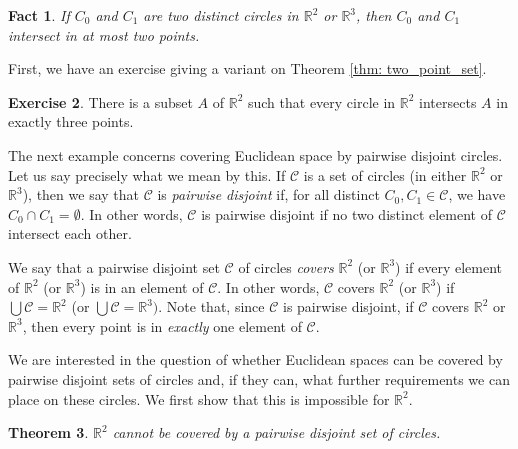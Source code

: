 \documentclass[a4paper]{memoir}
\newtheorem{theorem}{Theorem}[section]
\newtheorem{fact}[theorem]{Fact}
\theoremstyle{definition}
\newtheorem{exercise}[theorem]{Exercise}
\newcommand{\bb}{\mathbb}
\newcommand{\mc}{\mathcal}
\begin{document}
\begin{fact}
  If $C_0$ and $C_1$ are two distinct circles in $\bb{R}^2$ or $\bb{R}^3$, then $C_0$ and $C_1$ 
  intersect in at most two points.
\end{fact}

First, we have an exercise giving a variant on Theorem \ref{thm: two_point_set}.

\begin{exercise}
  There is a subset $A$ of $\mathbb{R}^2$ such that every circle in $\bb{R}^2$ intersects $A$ in 
  exactly three points.
\end{exercise}

The next example concerns covering Euclidean space by pairwise disjoint circles. Let us say 
precisely what we mean by this. If $\mc{C}$ is a set of circles (in either $\bb{R}^2$ or 
$\bb{R}^3$), then we say that $\mc{C}$ is \emph{pairwise disjoint} if, for all distinct 
$C_0, C_1 \in \mathcal{C}$, we have $C_0 \cap C_1 = \emptyset$. In other words, 
$\mc{C}$ is pairwise disjoint if no two distinct element of $\mc{C}$ intersect each other.

We say that a pairwise disjoint set $\mc{C}$ of circles \emph{covers} $\bb{R}^2$ (or $\bb{R}^3$) 
if every element of $\bb{R}^2$ (or $\bb{R}^3$) is in an element of $\mc{C}$. In other words, 
$\mc{C}$ covers $\bb{R}^2$ (or $\bb{R}^3$) if $\bigcup \mc{C} = \bb{R}^2$ (or 
$\bigcup \mc{C} = \bb{R}^3)$. Note that, since $\mc{C}$ is pairwise disjoint, if 
$\mc{C}$ covers $\bb{R}^2$ or $\bb{R}^3$, then every point is in \emph{exactly} one element of 
$\mc{C}$. 

We are interested in the question of whether Euclidean spaces can be covered by pairwise disjoint sets of 
circles and, if they can, what further requirements we can place on these circles. We first show that 
this is impossible for $\bb{R}^2$.

\begin{theorem}
  $\bb{R}^2$ cannot be covered by a pairwise disjoint set of circles.
\end{theorem}
\end{document}

